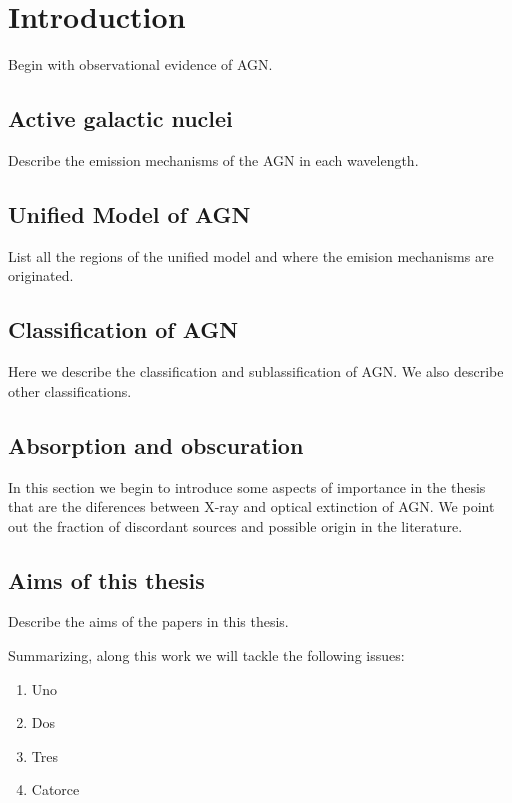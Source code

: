 
\chapter{Introduction} 
\label{chap:intro}

Begin with observational evidence of AGN.

\section{Active galactic nuclei}
\label{sec1:agn}
 
Describe the emission mechanisms of the AGN in each wavelength.

\section{Unified Model of AGN}
\label{sec1:um}

List all the regions of the unified model and where the emision mechanisms are originated.

\section{Classification of AGN}
\label{sec1:class}

Here we describe the classification and sublassification of AGN. We also describe other classifications.



\section{Absorption and obscuration}
\label{sec1:abs}

In this section we begin to introduce some aspects of importance in the thesis that are the diferences between X-ray and optical extinction of AGN. We point out the fraction of discordant sources and possible origin in the literature.




\section{Aims of this thesis}

Describe the aims of the papers in this thesis.

Summarizing, along this work we will tackle the following issues:
\begin{enumerate}
 \item Uno

 \item Dos

 \item Tres

 \item Catorce
\end{enumerate}

